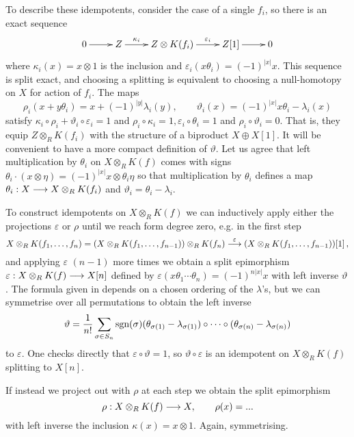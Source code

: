 \documentclass{compositio}
\theoremstyle{definition}
\numberwithin{equation}{section}
\begin{document}
To describe these idempotents, consider the case of a single $f_i$, so there is an exact sequence
\[
\xymatrix{
0 \ar[r] & Z \ar[r]^-{\kappa_i} & Z \otimes K(f_i) \ar[r]^-{\varepsilon_i} & Z[1] \ar[r] & 0
}
\]
where $\kappa_i(x) = x \otimes 1$ is the inclusion and $\varepsilon_i( x \theta_i ) = (-1)^{|x|} x$. This sequence is split exact, and choosing a splitting is equivalent to choosing a null-homotopy on $X$ for action of $f_i$. The maps
\[
\rho_i(x + y \theta_i) = x + (-1)^{|y|} \lambda_i(y), \qquad \vartheta_i(x) = (-1)^{|x|} x \theta_i - \lambda_i(x)
\]
satisfy $\kappa_i \circ \rho_i + \vartheta_i \circ \varepsilon_i = 1$ and $\rho_i \circ \kappa_i = 1, \varepsilon_i \circ \theta_i = 1$ and $\rho_i \circ \vartheta_i = 0$. That is, they equip $Z \otimes_R K(f_i)$ with the structure of a biproduct $X \oplus X[1]$. It will be convenient to have a more compact definition of $\vartheta$. Let us agree that left multiplication by $\theta_i$ on $X \otimes_R K(f)$ comes with signs $\theta_i \cdot (x \otimes \eta) = (-1)^{|x|} x \otimes \theta_i \eta$ so that multiplication by $\theta_i$ defines a map $\theta_i: X \longrightarrow X \otimes_R K(f_i)$ and $\vartheta_i = \theta_i - \lambda_i$.

To construct idempotents on $X \otimes_R K(f)$ we can inductively apply either the projections $\varepsilon$ or $\rho$ until we reach form degree zero, e.g. in the first step
\[
X \otimes_R K(f_1,\ldots,f_n) = (X \otimes_R K(f_1,\ldots,f_{n-1})) \otimes_R K(f_n) \stackrel{\varepsilon}{\longrightarrow} (X \otimes_R K(f_1,\ldots,f_{n-1}))[1]\,,
\]
and applying $\varepsilon$ $(n-1)$ more times we obtain a split epimorphism $\varepsilon: X \otimes_R K(f) \longrightarrow X[n]$ defined by $\varepsilon(x \theta_1 \cdots \theta_n) = (-1)^{n|x|} x$ with left inverse $\vartheta$. The formula given in \cite[Section 4]{dm1102.2957} depends on a chosen ordering of the $\lambda$'s, but we can symmetrise over all permutations to obtain the left inverse
\[
\vartheta = \frac{1}{n!} \sum_{\sigma \in S_n} \textup{sgn}(\sigma) (\theta_{\sigma(1)} - \lambda_{\sigma(1)}) \circ \cdots \circ (\theta_{\sigma(n)} - \lambda_{\sigma(n)})
\]
to $\varepsilon$. One checks directly that $\varepsilon \circ \vartheta = 1$, so $\vartheta \circ \varepsilon$ is an idempotent on $X \otimes_R K(f)$ splitting to $X[n]$.

If instead we project out with $\rho$ at each step we obtain the split epimorphism
\[
\rho: X \otimes_R K(f) \longrightarrow X, \qquad \rho(x) = ...
\]
with left inverse the inclusion $\kappa(x) = x \otimes 1$. Again, symmetrising.
\end{document}
